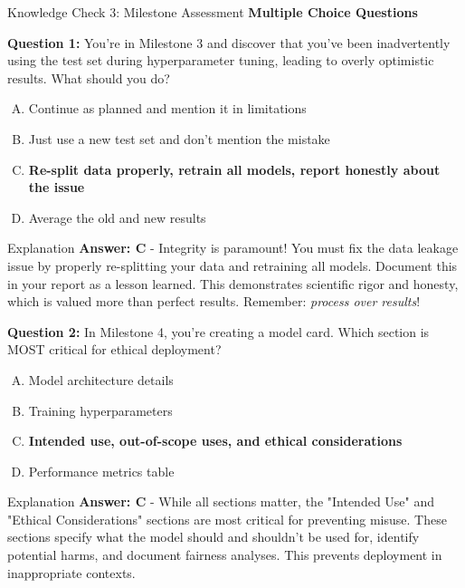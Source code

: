 \begin{frame}{Knowledge Check 3: Milestone Assessment}
\textbf{Multiple Choice Questions}

\vspace{0.3cm}

\textbf{Question 1:} You're in Milestone 3 and discover that you've been inadvertently using the test set during hyperparameter tuning, leading to overly optimistic results. What should you do?

\begin{enumerate}[A)]
\item Continue as planned and mention it in limitations
\item Just use a new test set and don't mention the mistake
\item \textcolor{forest}{\textbf{Re-split data properly, retrain all models, report honestly about the issue}}
\item Average the old and new results
\end{enumerate}

\pause

\begin{block}{Explanation}
\textcolor{forest}{\textbf{Answer: C}} - Integrity is paramount! You must fix the data leakage issue by properly re-splitting your data and retraining all models. Document this in your report as a lesson learned. This demonstrates scientific rigor and honesty, which is valued more than perfect results. Remember: \textit{process over results}!
\end{block}

\pause

\vspace{0.2cm}

\textbf{Question 2:} In Milestone 4, you're creating a model card. Which section is MOST critical for ethical deployment?

\begin{enumerate}[A)]
\item Model architecture details
\item Training hyperparameters
\item \textcolor{forest}{\textbf{Intended use, out-of-scope uses, and ethical considerations}}
\item Performance metrics table
\end{enumerate}

\pause

\begin{block}{Explanation}
\textcolor{forest}{\textbf{Answer: C}} - While all sections matter, the "Intended Use" and "Ethical Considerations" sections are most critical for preventing misuse. These sections specify what the model should and shouldn't be used for, identify potential harms, and document fairness analyses. This prevents deployment in inappropriate contexts.
\end{block}
\end{frame}

